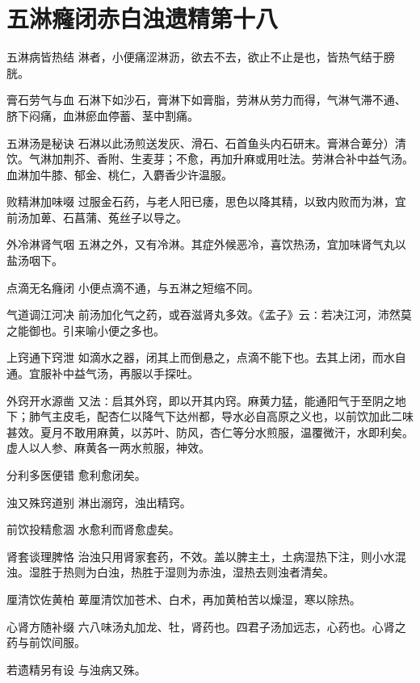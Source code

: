 \documentclass[a4paper,12pt,UTF8,twoside]{ctexbook}
\begin{document}
    
    
    
    \chapter{五淋癃闭赤白浊遗精第十八}
        
    五淋病皆热结
    淋者，小便痛涩淋沥，欲去不去，欲止不止是也，皆热气结于膀胱。
    
    膏石劳气与血
    石淋下如沙石，膏淋下如膏脂，劳淋从劳力而得，气淋气滞不通、脐下闷痛，血淋瘀血停蓄、茎中割痛。
    
    五淋汤是秘诀
    石淋以此汤煎送发灰、滑石、石首鱼头内石研末。膏淋合萆分）清饮。气淋加荆芥、香附、生麦芽；不愈，再加升麻或用吐法。劳淋合补中益气汤。血淋加牛膝、郁金、桃仁，入麝香少许温服。
    
    败精淋加味啜
    过服金石药，与老人阳已痿，思色以降其精，以致内败而为淋，宜前汤加萆、石菖蒲、菟丝子以导之。
    
    外冷淋肾气咽
    五淋之外，又有冷淋。其症外候恶冷，喜饮热汤，宜加味肾气丸以盐汤咽下。
    
    点滴无名癃闭
    小便点滴不通，与五淋之短缩不同。
    
    气道调江河决
    前汤加化气之药，或吞滋肾丸多效。《孟子》云∶若决江河，沛然莫之能御也。引来喻小便之多也。
    
    上窍通下窍泄
    如滴水之器，闭其上而倒悬之，点滴不能下也。去其上闭，而水自通。宜服补中益气汤，再服以手探吐。
    
    外窍开水源凿
    又法∶启其外窍，即以开其内窍。麻黄力猛，能通阳气于至阴之地下；肺气主皮毛，配杏仁以降气下达州都，导水必自高原之义也，以前饮加此二味甚效。夏月不敢用麻黄，以苏叶、防风，杏仁等分水煎服，温覆微汗，水即利矣。虚人以人参、麻黄各一两水煎服，神效。
    
    分利多医便错
    愈利愈闭矣。
    
    浊又殊窍道别
    淋出溺窍，浊出精窍。
    
    前饮投精愈涸
    水愈利而肾愈虚矣。
    
    肾套谈理脾恪
    治浊只用肾家套药，不效。盖以脾主土，土病湿热下注，则小水混浊。湿胜于热则为白浊，热胜于湿则为赤浊，湿热去则浊者清矣。
    
    厘清饮佐黄柏
    萆厘清饮加苍术、白术，再加黄柏苦以燥湿，寒以除热。
    
    心肾方随补缀
    六八味汤丸加龙、牡，肾药也。四君子汤加远志，心药也。心肾之药与前饮间服。
    
    若遗精另有设
    与浊病又殊。
    
\end{document}
